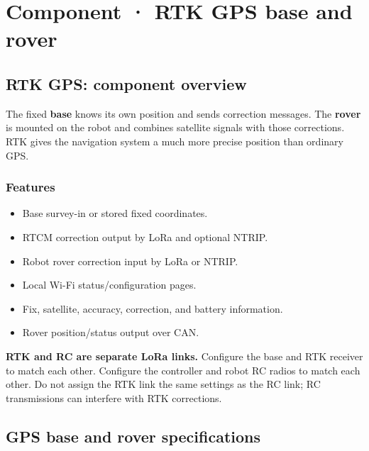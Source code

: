 \documentclass[
  10pt,
  letterpaper,
  openany]{report}
\providecommand{\tightlist}{%
  \setlength{\itemsep}{0pt}\setlength{\parskip}{0pt}}
\begin{document}
\chapter{Component · RTK GPS base and
rover}\label{component-rtk-gps-base-and-rover}

\protect{}\label{gps}
\section{RTK GPS: component overview}\label{rtk-gps-component-overview}

The fixed \textbf{base} knows its own position and sends correction
messages. The \textbf{rover} is mounted on the robot and combines
satellite signals with those corrections. RTK gives the navigation
system a much more precise position than ordinary GPS.

\subsection{Features}\label{features-2}

\begin{itemize}
\tightlist
\item
  Base survey-in or stored fixed coordinates.
\item
  RTCM correction output by LoRa and optional NTRIP.
\item
  Robot rover correction input by LoRa or NTRIP.
\item
  Local Wi-Fi status/configuration pages.
\item
  Fix, satellite, accuracy, correction, and battery information.
\item
  Rover position/status output over CAN.
\end{itemize}

\begin{manualdanger}

\textbf{RTK and RC are separate LoRa links.} Configure the base and RTK
receiver to match each other. Configure the controller and robot RC
radios to match each other. Do not assign the RTK link the same settings
as the RC link; RC transmissions can interfere with RTK corrections.

\end{manualdanger}

\protect{}\label{gps-specs}
\section{GPS base and rover
specifications}\label{gps-base-and-rover-specifications}
\end{document}
